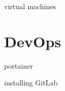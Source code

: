 \documentclass[titlepage]{article}
\begin{document}
virtual machines

\section{DevOps}

portainer

installing GitLab







\setlength{\bibleftmargin}{.125in}
\doublespacing


\nocite{*}
\end{document}
